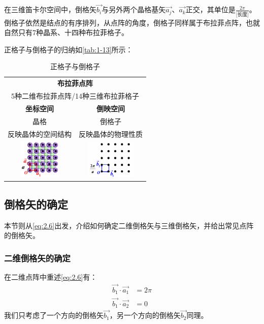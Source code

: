    在三维笛卡尔空间中，倒格矢$\vec{b_i}$与另外两个晶格基矢$\vec{a_j}$、$\vec{a_k}$正交，其单位是$\frac{2\pi}{\mbox{[长度]}}$。倒格子依然是结点的有序排列，从点阵的角度，倒格子同样属于布拉菲点阵，也就自然只有7种晶系、十四种布拉菲格子。

    正格子与倒格子的归纳如\autoref{tab:1-13}所示：
    \begin{table}[!htbp]
        \centering
        \setlength{\tabcolsep}{1em}
        \begin{tabular}{cc}
            \toprule
            \multicolumn{2}{c}{\textbf{布拉菲点阵}}\\
            \multicolumn{2}{c}{5种二维布拉菲点阵/14种三维布拉菲格子}\\
            \midrule
            \textbf{坐标空间}           & \textbf{倒映空间}\\
            晶格                        & 倒格子\\
            反映晶体的空间结构           & 反映晶体的物理性质\\
            \midrule
            \includegraphics[valign=m, height=5em, keepaspectratio=true]{pic/2-02}&\includegraphics[valign=m, height=5em, keepaspectratio=true]{pic/2-03}\\
            \bottomrule
        \end{tabular}
        \caption{正格子与倒格子}
        \label{tab:1-13}
    \end{table}

\subsection{倒格矢的确定}
    本节则从\autoref{eq:2.6}出发，介绍如何确定二维倒格矢与三维倒格矢，并给出常见点阵的倒格矢。
\subsubsection{二维倒格矢的确定}
    在二维点阵中重述\autoref{eq:2.6}有：
    \begin{subequations}\label{eq:2.7}
    \begin{align}
        \vec{b_1} \cdot \vec{a_1} &= 2\pi\\
        \vec{b_1} \cdot \vec{a_2} &= 0
    \end{align}
    \end{subequations}
    我们只考虑了一个方向的倒格矢$\vec{b_1}$，另一个方向的倒格矢$\vec{b_2}$同理。

